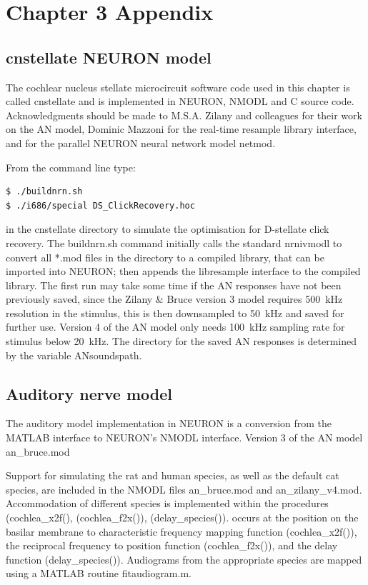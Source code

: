 \graphicspath{{../figures/}{./gfx/}{/media/data/Work/cnstellate/}{/media/data/Work/cnstellate/Responses/}}

\chapter{Chapter 3 Appendix}\label{sec:ch3appendix}
\section{\textsf{cnstellate} NEURON model}

The cochlear nucleus stellate microcircuit software code used in this chapter is
called \textsf{cnstellate} and is implemented in NEURON, NMODL and C source
code. Acknowledgments should be made to M.S.A. Zilany and colleagues for their
work on the AN model, Dominic Mazzoni for the real-time resample library
interface, and \citet{MiglioreCanniaEtAl:2006} for the parallel NEURON
neural network model \textsf{netmod}.

From the command line type:
\begin{verbatim}
$ ./buildnrn.sh
$ ./i686/special DS_ClickRecovery.hoc
\end{verbatim}
in the \textsf{cnstellate} directory to simulate the optimisation for D-stellate
click recovery.  The \textsf{buildnrn.sh} command initially calls the standard
\textsf{nrnivmodl} to convert all *.mod files in the directory to a compiled
library, that can be imported into NEURON; then appends the libresample
interface to the compiled library. The first run may take some time if the AN
responses have not been previously saved, since the Zilany \& Bruce version 3
model requires 500~kHz resolution in the stimulus, this is then downsampled to
50~kHz and saved for further use. Version 4 of the AN model
\citep{ZilanyBruceEtAl:2009} only needs 100~kHz sampling rate for stimulus below
20~kHz. The directory for the saved AN responses is determined by the variable
\textsf{ANsoundspath}.

\section{Auditory nerve model}

The auditory model implementation in NEURON is a conversion from the
MATLAB interface to NEURON's NMODL interface. Version 3 of the AN model \mbox{\textsf{an\_bruce.mod}}

Support for simulating the rat and human species, as well as the default cat species,  are included in the NMODL files
\mbox{\textsf{an\_bruce.mod}} and \mbox{\textsf{an\_zilany\_v4.mod}}.
Accommodation of different species is implemented within the procedures
(\mbox{\textsf{cochlea\_x2f()}}, (\mbox{\textsf{cochlea\_f2x()}}),
(\mbox{\textsf{delay\_species()}}). occurs at the position on the basilar
membrane to characteristic frequency mapping function
(\mbox{\textsf{cochlea\_x2f()}}), the reciprocal frequency to position function
(\mbox{\textsf{cochlea\_f2x()}}), and the delay function
(\mbox{\textsf{delay\_species()}}).  Audiograms from the appropriate species are
mapped using a MATLAB routine \mbox{\textsf{fitaudiogram.m}}.

